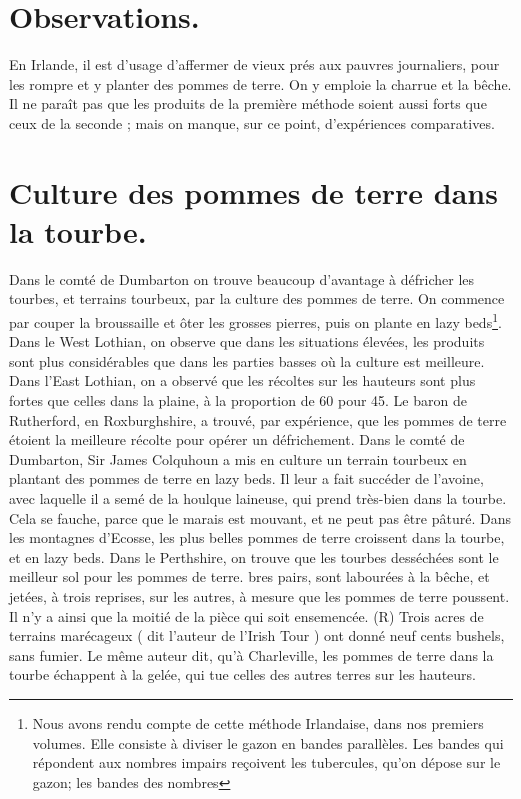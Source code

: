 \section{Observations.}
En Irlande, il est d'usage d'affermer de vieux prés aux pauvres journaliers, pour les rompre et y planter des pommes de terre. On y emploie la charrue et la bêche. Il ne paraît pas que les produits de la première méthode soient aussi forts que ceux de la seconde ; mais on manque, sur ce point, d'expériences comparatives.
\section{Culture des pommes de terre dans la tourbe.}
Dans le comté de Dumbarton on trouve beaucoup d'avantage à défricher les tourbes, et terrains tourbeux, par la culture des pommes de terre. On commence par couper la broussaille et ôter les grosses pierres, puis on plante en lazy beds\footnote{Nous avons rendu compte de cette méthode Irlandaise, dans nos premiers volumes. Elle consiste à diviser le gazon en bandes parallèles. Les bandes qui répondent aux nombres impairs reçoivent les tubercules, qu'on dépose sur le gazon; les bandes des nombres}.\setcounter{page}{269} Dans le West Lothian, on observe que dans les situations élevées, les produits sont plus considérables que dans les parties basses où la culture est meilleure. Dans l'East Lothian, on a observé que les récoltes sur les hauteurs sont plus fortes que celles dans la plaine, à la proportion de 60 pour 45.
Le baron de Rutherford, en Roxburghshire, a trouvé, par expérience, que les pommes de terre étoient la meilleure récolte pour opérer un défrichement.
Dans le comté de Dumbarton, Sir James Colquhoun a mis en culture un terrain tourbeux en plantant des pommes de terre en lazy beds. Il leur a fait succéder de l'avoine, avec laquelle il a semé de la houlque laineuse, qui prend très-bien dans la tourbe. Cela se fauche, parce que le marais est mouvant, et ne peut pas être pâturé.
Dans les montagnes d'Ecosse, les plus belles pommes de terre croissent dans la tourbe, et en lazy beds.
Dans le Perthshire, on trouve que les tourbes desséchées sont le meilleur sol pour les pommes de terre.
bres pairs, sont labourées à la bêche, et jetées, à trois reprises, sur les autres, à mesure que les pommes de terre poussent. Il n'y a ainsi que la moitié de la pièce qui soit ensemencée. (R)\setcounter{page}{270} Trois acres de terrains marécageux ( dit l'auteur de l'Irish Tour ) ont donné neuf cents bushels, sans fumier. Le même auteur dit, qu'à Charleville, les pommes de terre dans la tourbe échappent à la gelée, qui tue celles des autres terres sur les hauteurs.
